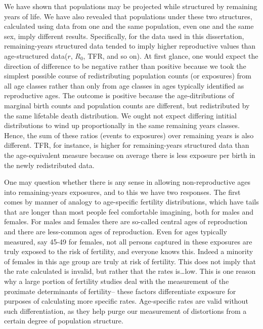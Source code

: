 We have shown that populations may be projected while structured by
remaining years of life. We have also revealed that populations under these two
structures, calculated using data from one and the same population, even one and the same
sex, imply different results. Specifically, for the data used in this
dissertation, remaining-years structured data tended to imply higher
reproductive values than age-structured data($r$, $R_0$, TFR, and so
on). At first glance, one would expect the direction of difference to be
negative rather than positive because we took the simplest possible course of
redistributing population counts (or exposures) from all age classes rather than
only from age classes in ages typically identified as reproductive ages. The
outcome is positive because the age-ditributions of marginal birth counts and
population counts are different, but redistributed by the same lifetable death
distribution. We ought not expect differing intitial distributions to wind up
proportionally in the same remaining years classes. Hence, the sum of these
ratios (events to exposures) over remaining years is also different. TFR, for
instance, is higher for remaining-years structured data than the age-equivalent
measure because on average there is less exposure per birth in the newly
redistributed data.

One may question whether there is any sense in allowing non-reproductive ages
into remaining-years exposures, and to this we have two responses. The first
comes by manner of analogy to age-specific fertility distributions, which
have tails that are longer than most people feel comfortable imagining, 
both for males and females. For males and
females there are so-called central ages of reproduction and there are
less-common ages of reproduction. Even for ages typically measured, say
45-49 for females, not all persons captured in these exposures are truly
exposed to the risk of fertility, and everyone knows this. Indeed a minority
of females in this age group are truly at risk of fertility. This does not imply
that the rate calculated is invalid, but rather that the rates is\ldots low.
This is one reason why a large portion of fertility studies deal with the
measurement of the proximate determinants of fertility-- these
factors differentiate exposure for purposes of calculating more specific rates.
Age-specific rates are valid without such differentiation, as they help purge
our measurement of distortions from a certain degree of population structure. 

